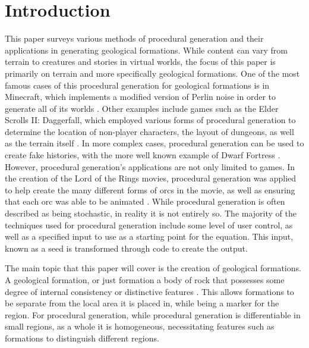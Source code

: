 \documentclass[10pt]{report}
\begin{document}
	\clearpage
	
	\tableofcontents
	
	\clearpage
	
	\let\clearpage\relax
	\chapter{Introduction}
	
		This paper surveys various methods of procedural generation and their applications in generating geological formations. While content can vary from terrain to creatures and stories in virtual worlds, the focus of this paper is primarily on terrain and more specifically geological formations. One of the most famous cases of this procedural generation for geological formations is in Minecraft, which implements a modified version of Perlin noise in order to generate all of its worlds \cite{minecraft-gen}. Other examples include games such as the Elder Scrolls II: Daggerfall, which employed various forms of procedural generation to determine the location of non-player characters, the layout of dungeons, as well as the terrain itself \cite{daggerfall}. In more complex cases, procedural generation can be used to create fake histories, with the more well known example of Dwarf Fortress \cite{df-dev}. However, procedural generation's applications are not only limited to games. In the creation of the Lord of the Rings movies, procedural generation was applied to help create the many different forms of orcs in the movie, as well as ensuring that each orc was able to be animated \cite{massive}. While procedural generation is often described as being stochastic, in reality it is not entirely so. The majority of the techniques used for procedural generation include some level of user control, as well as a specified input to use as a starting point for the equation. This input, known as a seed is transformed through code to create the output.
		
		The main topic that this paper will cover is the creation of geological formations. A geological formation, or just formation a body of rock that possesses some degree of internal consistency or distinctive features \cite{2005}. This allows formations to be separate from the local area it is placed in, while being a marker for the region. For procedural generation, while procedural generation is differentiable in small regions, as a whole it is homogeneous, necessitating features such as formations to distinguish different regions. 
		
\end{document}
